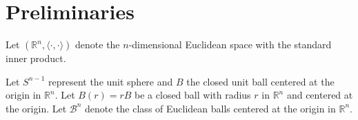 \documentclass[12pt, reqno]{amsart}
\theoremstyle{definition}
\theoremstyle{remark}
\numberwithin{equation}{section}
\newcommand{\Rn}{\mathbb{R}^{n}}
\newcommand{\Sn}{S^{n-1}}
\newcommand{\Lp}{L_{p}}
\begin{document}

\vspace{1\baselineskip} 
	\section{Preliminaries}
	Let $\left( \mathbb{R}^n, \langle \cdot, \cdot \rangle\right) $ denote the $n$-dimensional Euclidean space  with the standard inner product.
	
	Let $S^{n-1}$ represent the unit sphere and $B$ the closed unit ball centered at the origin in $\mathbb{R}^n$.
	Let $B(r)=rB$ be a closed ball with radius $r$ in $\Rn$ and centered at the origin.  	Let $\mathcal{B}^n$ denote the class of Euclidean balls centered at the origin in $\mathbb{R}^n$.
	
\end{document}
